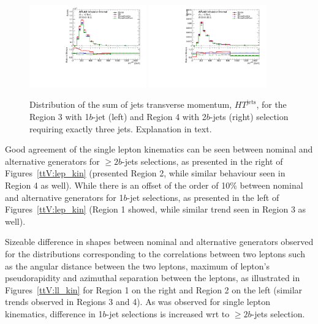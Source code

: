 \begin{figure}[!htb]
\centering
\includegraphics[width=0.45\textwidth]{Plots/ttV/c_Region_2_HT_jets}
\includegraphics[width=0.45\textwidth]{Plots/ttV/c_Region_3_HT_jets}\\
  \caption{Distribution of the sum of jets transverse momentum, $HT^{\text{jets}}$, for the Region 3 with 1$b$-jet (left) and Region 4 with 2$b$-jets (right) selection requiring exactly three jets. Explanation in text. \label{ttV:3j12b}}
\end{figure}

Good agreement of the single lepton kinematics can be seen between nominal and alternative generators for $\geq2b$-jets selections, as presented in the right of Figures~\ref{ttV:lep_kin} (presented Region 2, while similar behaviour seen in Region 4 as well). 
While there is an offset of the order of 10\%  between nominal and alternative generators for 1$b$-jet selections, as presented in the left of Figures~\ref{ttV:lep_kin} (Region 1 showed, while similar trend seen in Region 3 as well). 

Sizeable difference in shapes between nominal and alternative generators observed for the distributions corresponding to the correlations between two leptons such as the angular distance between the two leptons, maximum of lepton's pseudorapidity and azimuthal separation between the leptons, as illustrated in Figures~\ref{ttV:ll_kin} for Region 1 on the right and Region 2 on the left (similar trends observed in Regions 3 and 4).
As was observed for single lepton kinematics, difference in 1$b$-jet selections is increased wrt to $\geq2b$-jets selection.

